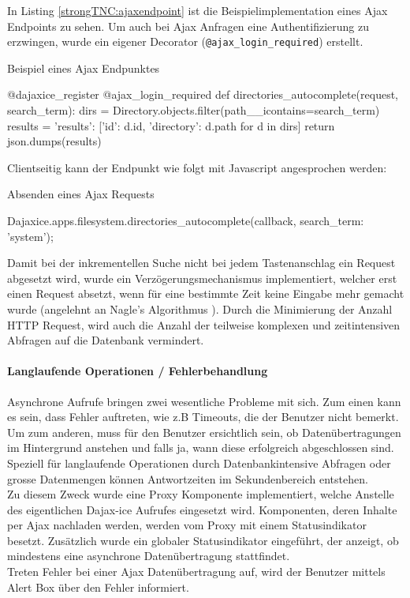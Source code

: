 In Listing \autoref{strongTNC:ajaxendpoint} ist die Beispielimplementation eines Ajax Endpoints zu sehen. Um auch bei Ajax Anfragen eine Authentifizierung zu erzwingen, wurde ein eigener Decorator (\texttt{@ajax\_login\_required}) erstellt. 
\begin{listing}
\caption{Beispiel eines Ajax Endpunktes}
\label{strongTNC:ajaxendpoint}
\begin{pythoncode}
@dajaxice_register
@ajax_login_required
def directories_autocomplete(request, search_term):
    dirs = Directory.objects.filter(path__icontains=search_term)
    results = {'results': [{'id': d.id, 'directory': d.path} for d in dirs]}
    return json.dumps(results)
\end{pythoncode}
\end{listing}

Clientseitig kann der Endpunkt wie folgt mit Javascript angesprochen werden:
\begin{listing}
\caption{Absenden eines Ajax Requests}
\begin{jscode}
Dajaxice.apps.filesystem.directories_autocomplete(callback, {search_term: 'system'});
\end{jscode} 
\end{listing}

Damit bei der inkrementellen Suche nicht bei jedem Tastenanschlag ein Request
abgesetzt wird, wurde ein Verzögerungsmechanismus implementiert, welcher erst einen Request
absetzt, wenn für eine bestimmte Zeit keine Eingabe mehr gemacht wurde (angelehnt an Nagle's Algorithmus \cite{nagle1984congestion}).
Durch die Minimierung der Anzahl HTTP Request, wird auch die Anzahl der teilweise komplexen und zeitintensiven Abfragen auf die Datenbank vermindert.

\paragraph{Langlaufende Operationen / Fehlerbehandlung}
Asynchrone Aufrufe bringen zwei wesentliche Probleme mit sich. Zum einen kann es sein, dass Fehler auftreten, wie z.B Timeouts, die der Benutzer nicht bemerkt. Um zum anderen, muss für den Benutzer ersichtlich sein, ob Datenübertragungen im Hintergrund anstehen und falls ja, wann diese erfolgreich abgeschlossen sind. Speziell für langlaufende Operationen durch Datenbankintensive Abfragen oder grosse Datenmengen können Antwortzeiten im Sekundenbereich entstehen. \\
Zu diesem Zweck wurde eine Proxy Komponente \cite{gamma1994design} implementiert, welche Anstelle des eigentlichen Dajax-ice Aufrufes eingesetzt wird. Komponenten, deren Inhalte per Ajax nachladen werden, werden vom Proxy mit einem Statusindikator besetzt. Zusätzlich wurde ein globaler Statusindikator eingeführt, der anzeigt, ob mindestens eine asynchrone Datenübertragung stattfindet.\\
Treten Fehler bei einer Ajax Datenübertragung auf, wird der Benutzer mittels Alert Box über den Fehler informiert.

